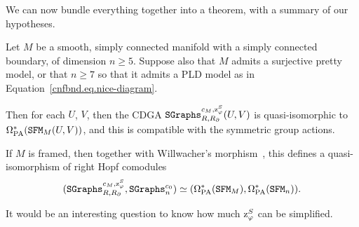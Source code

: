 We can now bundle everything together into a theorem, with a summary of our hypotheses.

\begin{theorem}
  \label{cnfbnd.thm.sgraphs-sfm}
  Let $M$ be a smooth, simply connected manifold with a simply connected boundary, of dimension $n \geq 5$.
  Suppose also that $M$ admits a surjective pretty model, or that $n \geq 7$ so that it admits a PLD model as in Equation~\eqref{cnfbnd.eq.nice-diagram}.

  Then for each $U$, $V$, then the CDGA $\mathtt{SGraphs}^{c_{M}, \mathrm{z}^{S}_{\varphi}}_{R,R_{\partial}}(U,V)$ is quasi-isomorphic to $\Omega_{\mathrm{PA}}^{*}(\mathtt{SFM}_{M}(U,V))$, and this is compatible with the symmetric group actions.

  If $M$ is framed, then together with Willwacher's morphism~\cite{Willwacher2015a}, this defines a quasi-isomorphism of right Hopf comodules
  \[ (\mathtt{SGraphs}^{c_{M}, \mathrm{z}^{S}_{\varphi}}_{R, R_{\partial}}, \mathtt{SGraphs}^{c_{0}}_{n}) \simeq (\Omega_{\mathrm{PA}}^{*}(\mathtt{SFM}_{M}), \Omega_{\mathrm{PA}}^{*}(\mathtt{SFM}_{n})). \]
\end{theorem}

It would be an interesting question to know how much $\mathrm{z}^{S}_{\varphi}$ can be simplified.
